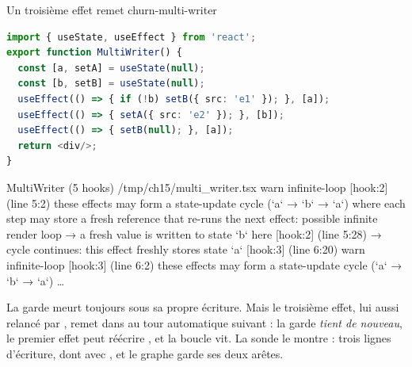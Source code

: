 \begin{exemple}{Un troisième effet remet }{churn-multi-writer}
\begin{lstlisting}[language=TypeScript,caption={\file{/tmp/ch15/multi_writer.tsx}},label={lst:churn-multi-writer}]
import { useState, useEffect } from 'react';
export function MultiWriter() {
  const [a, setA] = useState(null);
  const [b, setB] = useState(null);
  useEffect(() => { if (!b) setB({ src: 'e1' }); }, [a]);
  useEffect(() => { setA({ src: 'e2' }); }, [b]);
  useEffect(() => { setB(null); }, [a]);
  return <div/>;
}
\end{lstlisting}
\begin{sortie}
  MultiWriter  (5 hooks)  /tmp/ch15/multi_writer.tsx
    warn   infinite-loop  [hook:2]  (line 5:2)  these effects may form a state-update cycle (`a` → `b` → `a`) where each step may store a fresh reference that re-runs the next effect: possible infinite render loop
       → a fresh value is written to state `b` here [hook:2] (line 5:28)
       → cycle continues: this effect freshly stores state `a` [hook:3] (line 6:20)
    warn   infinite-loop  [hook:3]  (line 6:2)  these effects may form a state-update cycle (`a` → `b` → `a`) …
\end{sortie}
\end{exemple}

La garde  meurt toujours sous sa propre écriture. Mais le troisième effet,
lui aussi relancé par , remet  dans  au tour automatique
suivant : la garde \emph{tient de nouveau}, le premier effet peut réécrire , et
la boucle vit. La sonde le montre : trois lignes d'écriture, dont  avec
, et le graphe garde ses deux arêtes.



